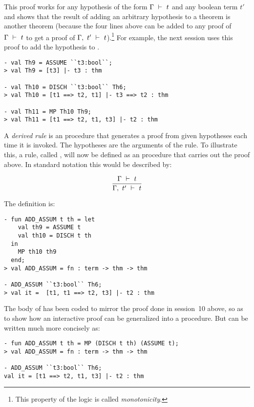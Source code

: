 \noindent This proof works for any hypothesis of the form $\Gamma\ \vdash\  t$
and any boolean term $t'$ and shows that the result of adding an
arbitrary hypothesis to a theorem is another theorem (because the four
lines above can be added to any proof of $\Gamma\ \vdash\  t$ to get a
proof of $\Gamma,\ t'\ \vdash\  t$).\footnote{This property of the logic is
  called {\it monotonicity}.} For example, the next session uses this
proof to add the hypothesis  to .

\begin{session}\begin{verbatim}
- val Th9 = ASSUME ``t3:bool``;
> val Th9 = [t3] |- t3 : thm

- val Th10 = DISCH ``t3:bool`` Th6;
> val Th10 = [t1 ==> t2, t1] |- t3 ==> t2 : thm

- val Th11 = MP Th10 Th9;
> val Th11 = [t1 ==> t2, t1, t3] |- t2 : thm
\end{verbatim}\end{session}


    A {\it derived rule\/} is an \ML{} procedure that generates a proof
    from given hypotheses each time it is invoked. The hypotheses are
    the arguments of the rule.  To illustrate this, a rule, called
    , will now be defined as an \ML{} procedure that
    carries out the proof above. In standard notation this would be
    described by:

\[ \frac{\Gamma\ \vdash\  t}{\Gamma,\ t'\ \vdash\  t} \]

\noindent The \ML{} definition is:

\begin{session}\begin{verbatim}
- fun ADD_ASSUM t th = let
    val th9 = ASSUME t
    val th10 = DISCH t th
  in
    MP th10 th9
  end;
> val ADD_ASSUM = fn : term -> thm -> thm

- ADD_ASSUM ``t3:bool`` Th6;
> val it =  [t1, t1 ==> t2, t3] |- t2 : thm
\end{verbatim}\end{session}

\noindent The body of  has been coded  to mirror  the proof done
in session~10 above, so as to show how an interactive proof can be
generalized into a procedure.  But  can be written much
more concisely as:

\begin{session}\begin{verbatim}
- fun ADD_ASSUM t th = MP (DISCH t th) (ASSUME t);
> val ADD_ASSUM = fn : term -> thm -> thm

- ADD_ASSUM ``t3:bool`` Th6;
val it = [t1 ==> t2, t1, t3] |- t2 : thm
\end{verbatim}\end{session}


